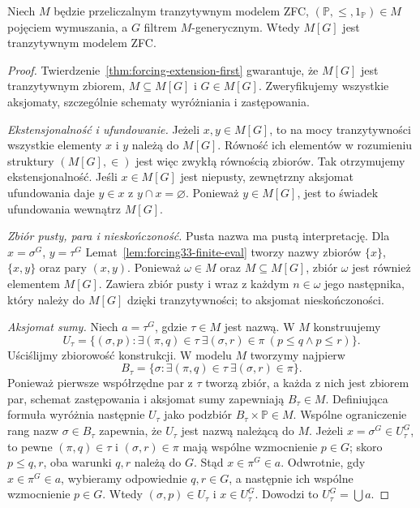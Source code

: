 \begin{twierdzenie}
\label{thm:forcing33-zfc}
Niech $M$ będzie przeliczalnym
tranzytywnym modelem ZFC,
$(\mathbb P,\leq,1_{\mathbb P})\in M$
pojęciem wymuszania, a $G$
filtrem $M$-generycznym.
Wtedy $M[G]$ jest tranzytywnym
modelem ZFC.
\end{twierdzenie}
\begin{proof}
Twierdzenie~\ref{thm:forcing-extension-first}
gwarantuje, że $M[G]$ jest
tranzytywnym zbiorem, $M\subseteq M[G]$
i $G\in M[G]$. Zweryfikujemy
wszystkie aksjomaty, szczególnie
schematy wyróżniania i zastępowania.

\emph{Ekstensjonalność i ufundowanie.}
Jeżeli $x,y\in M[G]$, to na mocy
tranzytywności wszystkie elementy
$x$ i $y$ należą do $M[G]$.
Równość ich elementów w rozumieniu
struktury $(M[G],\in)$ jest więc
zwykłą równością zbiorów. Tak
otrzymujemy ekstensjonalność.
Jeśli $x\in M[G]$ jest niepusty,
zewnętrzny aksjomat ufundowania
daje $y\in x$ z $y\cap x=\varnothing$.
Ponieważ $y\in M[G]$, jest to
świadek ufundowania wewnątrz $M[G]$.

\emph{Zbiór pusty, para i nieskończoność.}
Pusta nazwa ma pustą interpretację.
Dla $x=\sigma^G$, $y=\tau^G$
Lemat~\ref{lem:forcing33-finite-eval}
tworzy nazwy zbiorów $\{x\}$,
$\{x,y\}$ oraz pary $(x,y)$.
Ponieważ $\omega\in M$ oraz
$M\subseteq M[G]$, zbiór $\omega$
jest również elementem $M[G]$.
Zawiera zbiór pusty i wraz z
każdym $n\in\omega$ jego następnika,
który należy do $M[G]$ dzięki
tranzytywności; to aksjomat nieskończoności.

\emph{Aksjomat sumy.}
Niech $a=\tau^G$, gdzie $\tau\in M$
jest nazwą. W $M$ konstruujemy
\[
 U_\tau=\{(\sigma,p):
 \exists(\pi,q)\in\tau\
 \exists(\sigma,r)\in\pi\
 (p\leq q\land p\leq r)\}.
\]
Uściślijmy zbiorowość konstrukcji.
W modelu $M$ tworzymy najpierw
\[
 B_\tau=\{\sigma:\exists(\pi,q)\in\tau\
                  \exists(\sigma,r)\in\pi\}.
\]
Ponieważ pierwsze współrzędne par
z $\tau$ tworzą zbiór, a każda
z nich jest zbiorem par, schemat
zastępowania i aksjomat sumy
zapewniają $B_\tau\in M$.
Definiująca formuła wyróżnia następnie
$U_\tau$ jako podzbiór
$B_\tau\times\mathbb P\in M$.
Wspólne ograniczenie rang nazw
$\sigma\in B_\tau$ zapewnia,
że $U_\tau$ jest nazwą należącą do $M$.
Jeżeli $x=\sigma^G\in U_\tau^G$,
to pewne $(\pi,q)\in\tau$
i $(\sigma,r)\in\pi$ mają
wspólne wzmocnienie $p\in G$;
skoro $p\leq q,r$, oba
warunki $q,r$ należą do $G$.
Stąd $x\in\pi^G\in a$.
Odwrotnie, gdy
$x\in\pi^G\in a$, wybieramy
odpowiednie $q,r\in G$,
a następnie ich wspólne wzmocnienie
$p\in G$. Wtedy $(\sigma,p)\in U_\tau$
i $x\in U_\tau^G$.
Dowodzi to $U_\tau^G=\bigcup a$.


\end{proof}
